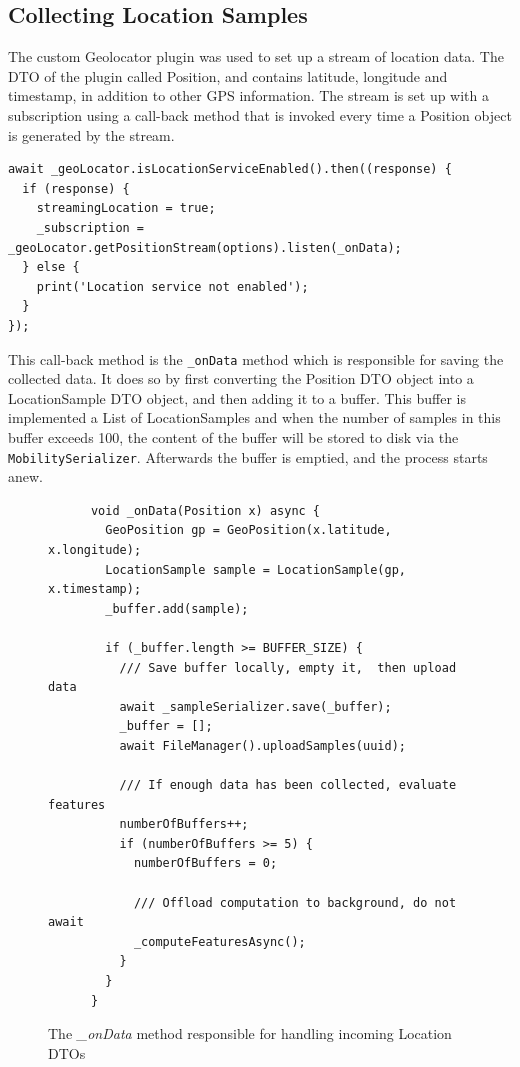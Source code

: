 \subsection{Collecting Location Samples}
The custom Geolocator plugin was used to set up a stream of location data. The DTO of the plugin called Position, and contains latitude, longitude and timestamp, in addition to other GPS information. The stream is set up with a subscription using a call-back method that is invoked every time a Position object is generated by the stream. 

\begin{verbatim}
await _geoLocator.isLocationServiceEnabled().then((response) {
  if (response) {
    streamingLocation = true;
    _subscription = _geoLocator.getPositionStream(options).listen(_onData);
  } else {
    print('Location service not enabled');
  }
});
\end{verbatim}

This call-back method is the \verb|_onData| method which is responsible for saving the collected data. It does so by first converting the Position DTO object into a LocationSample DTO object, and then adding it to a buffer. This buffer is implemented a List of LocationSamples and when the number of samples in this buffer exceeds 100, the content of the buffer will be stored to disk via the \verb|MobilitySerializer|. Afterwards the buffer is emptied, and the process starts anew. 

\begin{figure}
    \centering
    \begin{verbatim}
      void _onData(Position x) async {
        GeoPosition gp = GeoPosition(x.latitude, x.longitude);
        LocationSample sample = LocationSample(gp, x.timestamp);
        _buffer.add(sample);

        if (_buffer.length >= BUFFER_SIZE) {
          /// Save buffer locally, empty it,  then upload data
          await _sampleSerializer.save(_buffer);
          _buffer = [];
          await FileManager().uploadSamples(uuid);
    
          /// If enough data has been collected, evaluate features
          numberOfBuffers++;
          if (numberOfBuffers >= 5) {
            numberOfBuffers = 0;
    
            /// Offload computation to background, do not await
            _computeFeaturesAsync();
          }
        }
      }
    \end{verbatim}
    \caption{The \textit{\_onData} method responsible for handling incoming Location DTOs}
    \label{fig:ondata-method}
\end{figure}


